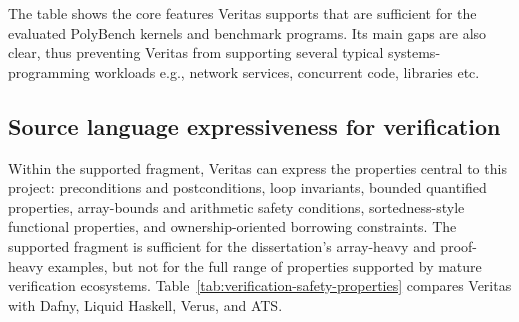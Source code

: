 The table shows the core features Veritas supports that are sufficient for the evaluated PolyBench kernels and benchmark programs. Its main gaps are also clear, thus preventing Veritas from supporting several typical systems-programming workloads e.g., network services, concurrent code, libraries etc.

\subsection{Source language expressiveness for verification}\label{sec:source-lang-eval}


Within the supported fragment, Veritas can express the properties central to this project: preconditions and postconditions, loop invariants, bounded quantified properties, array-bounds and arithmetic safety conditions, sortedness-style functional properties, and ownership-oriented borrowing constraints.
The supported fragment is sufficient for the dissertation's array-heavy and proof-heavy examples, %
but not for the full range of properties supported by mature verification ecosystems. Table~\ref{tab:verification-safety-properties} compares Veritas with Dafny, Liquid Haskell, Verus, and ATS.


